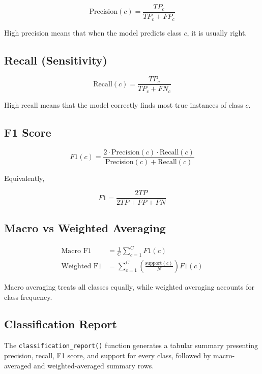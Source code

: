 \documentclass[10pt]{article}
\begin{document}
\begin{equation}
\text{Precision}(c) = \frac{TP_c}{TP_c + FP_c}
\end{equation}

High precision means that when the model predicts class \(c\), it is usually right.

\subsection{Recall (Sensitivity)}

\begin{equation}
\text{Recall}(c) = \frac{TP_c}{TP_c + FN_c}
\end{equation}

High recall means that the model correctly finds most true instances of class \(c\).

\subsection{F1 Score}

\begin{equation}
F1(c) = \frac{2 \cdot \text{Precision}(c)\cdot \text{Recall}(c)}{\text{Precision}(c)+\text{Recall}(c)}
\end{equation}

Equivalently,

\begin{equation}
F1 = \frac{2TP}{2TP + FP + FN}
\end{equation}

\subsection{Macro vs Weighted Averaging}

\begin{align}
\text{Macro F1} &= \frac{1}{C}\sum_{c=1}^{C} F1(c) \\
\text{Weighted F1} &= \sum_{c=1}^{C}\left(\frac{\text{support}(c)}{N}\right)F1(c)
\end{align}

Macro averaging treats all classes equally, while weighted averaging accounts for class frequency.

\subsection{Classification Report}

The \texttt{classification\_report()} function generates a tabular summary presenting precision, recall, F1 score, and support for every class, followed by macro-averaged and weighted-averaged summary rows.
\end{document}
